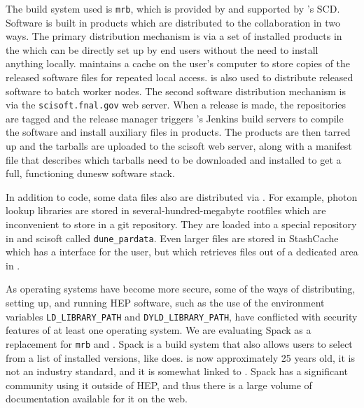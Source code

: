 \documentclass[../main-v1.tex]{subfiles}
\begin{document}
The build system used is {\tt mrb}, which is provided by and supported by 's SCD.  Software is built in  products which are distributed to the collaboration in two ways.  The primary distribution mechanism is via a set of installed products in the  which can be directly set up by end users without the need to install anything locally.   maintains a cache on the user's computer to store copies of the released software files for repeated local access.   is also used to distribute released software to batch worker nodes.  The second software distribution mechanism is via the {\tt scisoft.fnal.gov} web server.  When a release is made, the repositories are tagged and the release manager triggers 's Jenkins build servers to compile the software and install auxiliary files in  products.  The  products are then tarred up and the tarballs are uploaded to the scisoft web server, along with a manifest file that describes which tarballs need to be downloaded and installed to get a full, %
functioning dunesw software stack.

In addition to code, some data files also are distributed via .  For example, photon lookup libraries are stored in several-hundred-megabyte rootfiles which are inconvenient to store in a git repository.  They are loaded into a special repository in  and scisoft called {\tt dune\_pardata}.  Even larger files are stored in StashCache which has a  interface for the user, but which retrieves files out of a dedicated area in .

As operating systems have become more secure, some of the ways of distributing, setting up, and running HEP software, such as the use of the environment variables {\tt LD\_LIBRARY\_PATH} and {\tt DYLD\_LIBRARY\_PATH}, have conflicted with security features of at least one operating system.  We are evaluating Spack as a replacement for {\tt mrb} and .  Spack is a build system that also allows users to select from a list of installed versions, like  does.  is now approximately 25 years old, it is not an industry standard, and it is somewhat linked to .  Spack has a significant community using it outside of HEP, and thus there is a large volume of documentation available for it on the web.
\end{document}
